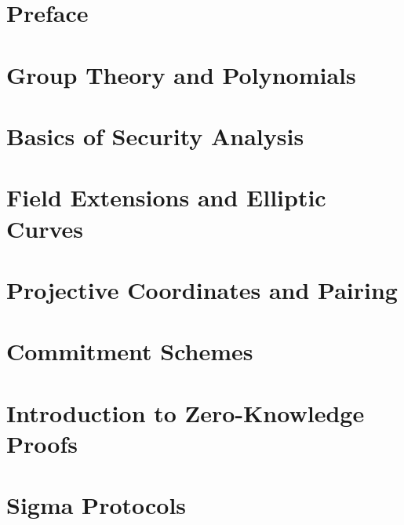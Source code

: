 \documentclass{zkdl-template-105x135-nohead}
\begin{document}

    \section*{Preface}

    

    \section{Group Theory and Polynomials} \label{section:math-crypto-1}

    

    \section{Basics of Security Analysis}\label{section:math-crypto-2}

    

    \section{Field Extensions and Elliptic Curves}

    \label{section:field_extensions}

    \section{Projective Coordinates and Pairing}

    

    \section{Commitment Schemes} \label{section:commitments}

     

    \section{Introduction to Zero-Knowledge Proofs} \label{section:intro-zk}

    

    \section{Sigma Protocols} \label{section:sigma}
\end{document}

